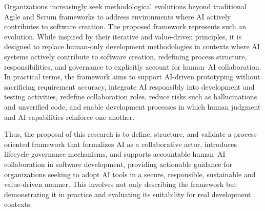 Organizations increasingly seek methodological evolutions beyond traditional Agile and Scrum frameworks to address environments where AI actively contributes to software creation. The proposed framework represents such an evolution. While inspired by their iterative and value-driven principles, it is designed to replace human-only development methodologies in contexts where AI systems actively contribute to software creation, redefining process structure, responsibilities, and governance to explicitly account for human–AI collaboration. In practical terms, the framework aims to support AI-driven prototyping without sacrificing requirement accuracy, integrate AI responsibly into development and testing activities, redefine collaboration roles, reduce risks such as hallucinations and unverified code, and enable development processes in which human judgment and AI capabilities reinforce one another.

Thus, the proposal of this research is to define, structure, and validate a process-oriented framework that formalizes AI as a collaborative actor, introduces lifecycle governance mechanisms, and supports accountable human–AI collaboration in software development, providing actionable guidance for organizations seeking to adopt AI tools in a secure, responsible, sustainable and value-driven manner. This involves not only describing the framework but demonstrating it in practice and evaluating its suitability for real development contexts.
